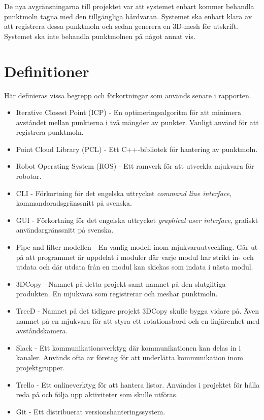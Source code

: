 De nya avgränsningarna till projektet var att systemet enbart kommer behandla punktmoln tagna med den tillgängliga hårdvaran. Systemet ska enbart klara av att registrera dessa punktmoln och sedan generera en 3D-mesh för utskrift. Systemet ska inte behandla punktmolnen på något annat vis.

\section{Definitioner}
\label{sec:definitions}
Här definieras vissa begrepp och förkortningar som används senare i rapporten.

\begin{itemize}
	\item Iterative Closest Point (ICP) - En optimeringsalgoritm för att minimera avståndet mellan punkterna i två mängder av punkter. Vanligt använd för att registrera punktmoln.
	\item Point Cloud Library (PCL) - Ett C++-bibliotek för hantering av punktmoln.
	\item Robot Operating System (ROS) - Ett ramverk för att utveckla mjukvara för robotar.
	\item CLI - Förkortning för det engelska uttrycket \textit{command line interface}, kommandoradsgränssnitt på svenska.
	\item GUI - Förkortning för det engelska uttrycket \textit{graphical user interface}, grafiskt användargränssnitt på svenska.
	\item Pipe and filter-modellen - En vanlig modell inom mjukvaruutveckling. Går ut på att programmet är uppdelat i moduler där varje modul har strikt in- och utdata och där utdata från en modul kan skickas som indata i nästa modul.
	\item 3DCopy - Namnet på detta projekt samt namnet på den slutgiltiga produkten. En mjukvara som registrerar och meshar punktmoln.
	\item TreeD - Namnet på det tidigare projekt 3DCopy skulle bygga vidare på. Även namnet på en mjukvara för att styra ett rotationsbord och en linjärenhet med avståndskamera.
	\item Slack - Ett kommunikationsverktyg där kommunikationen kan delas in i kanaler. Används ofta av företag för att underlätta kommunikation inom projektgrupper.
	\item Trello - Ett onlineverktyg för att hantera listor. Användes i projektet för hålla reda på och följa upp aktiviteter som skulle utföras.
	\item Git - Ett distribuerat versionshanteringssystem.

\end{itemize}
